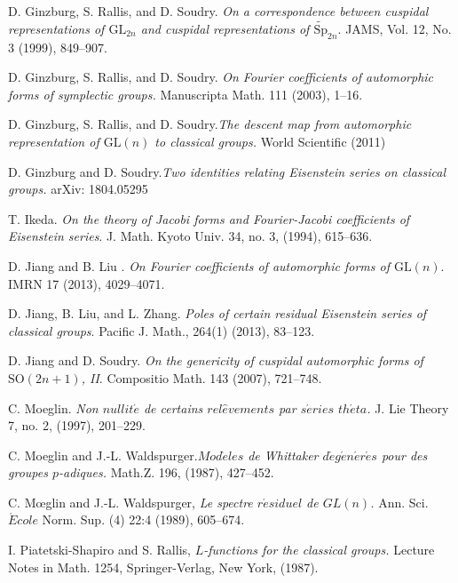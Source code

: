 \documentclass[12pts]{amsart}
\newcommand{\GL}{{\mathrm{GL}}}
\newcommand{\SO}{{\mathrm{SO}}}
\newcommand{\Sp}{{\mathrm{Sp}}}
\begin{document}
\begin{thebibliography}{}
	D. Ginzburg, S. Rallis, and D. Soudry. \textit{On a correspondence between cuspidal representations of $\GL_{2n}$ and cuspidal representations of $\widetilde{\Sp}_{2n}$}. JAMS, Vol. 12, No. 3 (1999), 849--907.
	
	
	D. Ginzburg, S. Rallis, and D. Soudry. \textit{On Fourier
		coefficients of automorphic forms of symplectic groups.} Manuscripta
	Math. 111 (2003), 1--16.
	
	D. Ginzburg, S. Rallis, and D. Soudry.\textit{The descent map from
		automorphic representation of $\GL(n)$ to classical groups.} World
	Scientific (2011)
	
	D. Ginzburg and D. Soudry.\textit{Two identities relating Eisenstein series on classical groups.} arXiv: 1804.05295
	
	
	T. Ikeda. \textit{On the theory of Jacobi forms and Fourier-Jacobi coefficients of Eisenstein series}. J. Math. Kyoto Univ. 34, no. 3, (1994), 615--636.
	
	D. Jiang and B. Liu . \textit{On Fourier coefficients of automorphic
		forms of $\GL(n)$}. IMRN 17 (2013), 4029--4071.
	
	D. Jiang, B. Liu, and L. Zhang. \textit{Poles of certain residual Eisenstein series of classical groups}. Pacific J. Math., 264(1) (2013), 83--123.
	
	D. Jiang and D. Soudry. \textit{On the genericity of cuspidal automorphic forms of $\SO(2n+1)$, II}. Compositio Math. 143 (2007), 721--748.
	
	C. Moeglin. \textit{Non $nullit\acute{e}$ de certains
		$rel\hat{e}vements$ par $s\acute{e}ries$ $th\acute{e}ta$.} J. Lie
	Theory 7, no. 2, (1997), 201--229.
	
	C. Moeglin and J.-L. Waldspurger.\textit{$Mod\grave{e}les$ de
		Whittaker $d\acute{e}g\acute{e}n\acute{e}r\acute{e}s$ pour des
		groupes $p$-adiques.} Math.Z. 196, (1987), 427--452.
	
C. Mœglin and J.-L. Waldspurger, \textit{Le spectre $r\acute{e}siduel$ de $GL(n)$.} Ann. Sci. $\acute{E}cole$ Norm. Sup. (4) 22:4 (1989), 605–674.

    I. Piatetski-Shapiro and S. Rallis, \textit{$L$-functions for the classical groups.} Lecture
    Notes in Math. 1254, Springer-Verlag, New York, (1987).
	

\end{thebibliography}
\end{document}
